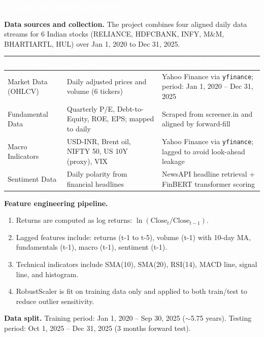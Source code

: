 \documentclass[10pt,a4paper]{article}
\newcommand{\SectionBar}[1]{%
  \vspace{0.35em}
  \noindent\colorbox{ReportBlue}{%
    \parbox{\dimexpr\linewidth-2\fboxsep\relax}{%
      \vspace{2.5pt}\textcolor{white}{\bfseries\footnotesize #1}\vspace{2.5pt}
    }%
  }%
  \vspace{0.35em}
}
\begin{document}
\vspace{6pt}

\SectionBar{1 \;|\; Data and Feature Engineering}
{\fontsize{8}{10.3}\selectfont\justifying
\textbf{Data sources and collection.} The project combines four aligned daily data streams for 6 Indian stocks (RELIANCE, HDFCBANK, INFY, M\&M, BHARTIARTL, HUL) over Jan 1, 2020 to Dec 31, 2025.

\begin{tabularx}{\linewidth}{|>{\RaggedRight\arraybackslash}p{2.9cm}|>{\RaggedRight\arraybackslash}p{4.5cm}|X|}
\hline
\rowcolor{ReportBlue}
\textcolor{white}{\textbf{Data Type}} & \textcolor{white}{\textbf{Coverage}} & \textcolor{white}{\textbf{Source and Notes}} \\
\hline
Market Data (OHLCV) & Daily adjusted prices and volume (6 tickers) & Yahoo Finance via \texttt{yfinance}; period: Jan 1, 2020 -- Dec 31, 2025 \\
\hline
Fundamental Data & Quarterly P/E, Debt-to-Equity, ROE, EPS; mapped to daily & Scraped from screener.in and aligned by forward-fill \\
\hline
Macro Indicators & USD-INR, Brent oil, NIFTY 50, US 10Y (proxy), VIX & Yahoo Finance via \texttt{yfinance}; lagged to avoid look-ahead leakage \\
\hline
Sentiment Data & Daily polarity from financial headlines & NewsAPI headline retrieval + FinBERT transformer scoring \\
\hline
\end{tabularx}

\textbf{Feature engineering pipeline.}
\begin{enumerate}
  \item Returns are computed as log returns: $\ln(\text{Close}_t/\text{Close}_{t-1})$.
  \item Lagged features include: returns (t-1 to t-5), volume (t-1) with 10-day MA, fundamentals (t-1), macro (t-1), sentiment (t-1).
  \item Technical indicators include SMA(10), SMA(20), RSI(14), MACD line, signal line, and histogram.
  \item RobustScaler is fit on training data only and applied to both train/test to reduce outlier sensitivity.
\end{enumerate}

\textbf{Data split.} Training period: Jan 1, 2020 -- Sep 30, 2025 ($\sim$5.75 years). Testing period: Oct 1, 2025 -- Dec 31, 2025 (3 months forward test).
}
\end{document}
